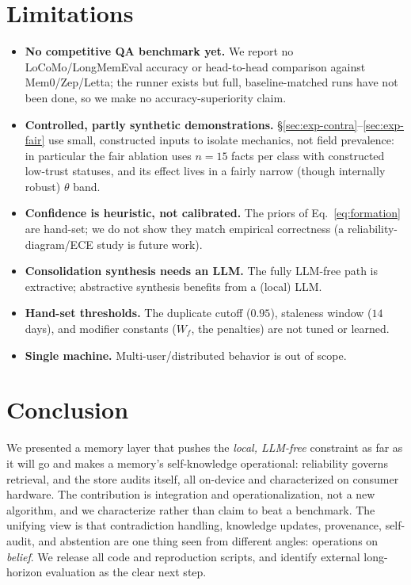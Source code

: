 \documentclass[11pt]{article}
\theoremstyle{definition}
\begin{document}
\section{Limitations}\label{sec:limits}
\begin{itemize}[leftmargin=1.4em]
  \item \textbf{No competitive QA benchmark yet.} We report no
  LoCoMo/LongMemEval accuracy or head-to-head comparison against Mem0/Zep/Letta;
  the runner exists but full, baseline-matched runs have not been done, so we
  make no accuracy-superiority claim.
  \item \textbf{Controlled, partly synthetic demonstrations.}
  \S\ref{sec:exp-contra}--\ref{sec:exp-fair} use small, constructed inputs to
  isolate mechanics, not field prevalence: in particular the fair ablation uses
  $n{=}15$ facts per class with constructed low-trust statuses, and its effect
  lives in a fairly narrow (though internally robust) $\theta$ band.
  \item \textbf{Confidence is heuristic, not calibrated.} The priors of
  Eq.~\eqref{eq:formation} are hand-set; we do not show they match empirical
  correctness (a reliability-diagram/ECE study is future work).
  \item \textbf{Consolidation synthesis needs an LLM.} The fully LLM-free path is
  extractive; abstractive synthesis benefits from a (local) LLM.
  \item \textbf{Hand-set thresholds.} The duplicate cutoff ($0.95$), staleness
  window ($14$ days), and modifier constants ($W_{\!f}$, the penalties) are not
  tuned or learned.
  \item \textbf{Single machine.} Multi-user/distributed behavior is out of scope.
\end{itemize}

\section{Conclusion}
We presented a memory layer that pushes the \emph{local, LLM-free} constraint as
far as it will go and makes a memory's self-knowledge operational: reliability
governs retrieval, and the store audits itself, all on-device and characterized
on consumer hardware. The contribution is integration and operationalization, not
a new algorithm, and we characterize rather than claim to beat a benchmark. The
unifying view is that contradiction handling, knowledge updates, provenance,
self-audit, and abstention are one thing seen from different angles: operations
on \emph{belief}. We release all code and reproduction scripts, and identify
external long-horizon evaluation as the clear next step.
\end{document}
